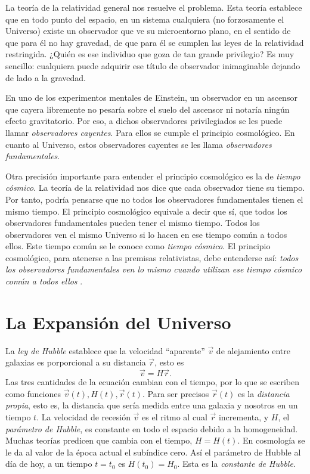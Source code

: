 \documentclass[a4paper,openright,12pt]{book}
\begin{document}
La teoría de la relatividad general nos resuelve el problema. Esta teoría establece que en todo punto del espacio, en un sistema cualquiera (no forzosamente el Universo) existe un observador que ve su microentorno plano, en el sentido de que para él no hay gravedad, de que para él se cumplen las leyes de la relatividad restringida. ¿Quién es ese individuo que goza de tan grande privilegio? Es muy sencillo: cualquiera puede adquirir ese título de observador inimaginable dejando de lado a la gravedad.

En uno de los experimentos mentales de Einstein, un observador en un ascensor que cayera libremente no pesaría sobre el suelo del ascensor ni notaría ningún efecto gravitatorio. Por eso, a dichos observadores privilegiados se les puede llamar \textit{observadores cayentes}. Para ellos se cumple el principio cosmológico. En cuanto al Universo, estos observadores cayentes se les llama \textit{observadores fundamentales}.

Otra precisión importante para entender el principio cosmológico es la de \textit{tiempo cósmico}. La teoría de la relatividad nos dice que cada observador tiene su tiempo. Por tanto, podría pensarse que no todos los observadores fundamentales tienen el mismo tiempo. El principio cosmológico equivale a decir que sí, que todos los observadores fundamentales pueden tener el mismo tiempo. Todos los observadores ven el mismo Universo si lo hacen en ese tiempo común a todos ellos. Este tiempo común se le conoce como \textit{tiempo cósmico}. El principio cosmológico, para atenerse a las premisas relativistas, debe entenderse así: \textit{todos los observadores fundamentales ven lo mismo cuando utilizan ese tiempo cósmico común a todos ellos} \cite{1.02}.


\section{La Expansión del Universo}
La \textit{ley de Hubble} \cite{1.1} establece que la velocidad ``aparente'' $\vec{v}$ de alejamiento entre galaxias es porporcional a su distancia $\vec{r}$, esto es
\begin{equation}
\vec{v} = H\vec{r}.\label{eqn 1.1}
\end{equation}
Las tres cantidades de la ecuación cambian con el tiempo, por lo que se escriben como funciones $\vec{v}(t), H(t), \vec{r}(t)$. Para ser precisos $\vec{r}(t)$ es la \textit{distancia propia}, esto es, la distancia que sería medida entre una galaxia y nosotros en un tiempo $t$. La velocidad de recesión $\vec{v}$ es el ritmo al cual $\vec{r}$ incrementa, y $H$, el \textit{parámetro de Hubble}, es constante en todo el espacio debido a la homogeneidad. Muchas teorías predicen que cambia con el tiempo, $H = H(t)$. En cosmología se le da al valor de la época actual el subíndice cero. Así el parámetro de Hubble al día de hoy, a un tiempo $t= t_{0}$ es $H(t_{0})= H_{0}$. Esta es la \textit{constante de Hubble}.
\end{document}

